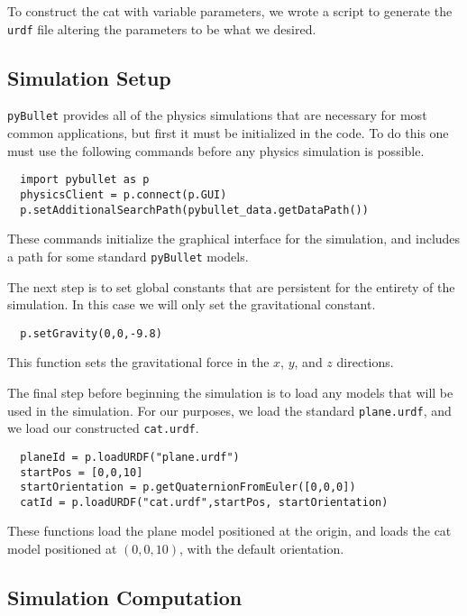 \documentclass[12]{amsart}
\theoremstyle{definition}
\begin{document}
To construct the cat with variable parameters, we wrote a script to generate
the \texttt{urdf} file altering the parameters to be what we desired.

\subsection{Simulation Setup}%
\label{sub:simulation_setup}

\texttt{pyBullet} provides all of the physics simulations that are necessary
for most common applications, but first it must be initialized in the code. To
do this one must use the following commands before any physics simulation is
possible.
\begin{verbatim}
  import pybullet as p
  physicsClient = p.connect(p.GUI)
  p.setAdditionalSearchPath(pybullet_data.getDataPath())
\end{verbatim}
These commands initialize the graphical interface for the simulation, and
includes a path for some standard \texttt{pyBullet} models.

The next step is to set global constants that are persistent for the entirety
of the simulation. In this case we will only set the gravitational constant.
\begin{verbatim}
  p.setGravity(0,0,-9.8)
\end{verbatim}
This function sets the gravitational force in the $x$, $y$, and $z$ directions.

The final step before beginning the simulation is to load any models that will
be used in the simulation. For our purposes, we load the standard
\texttt{plane.urdf}, and we load our constructed \texttt{cat.urdf}.
\begin{verbatim}
  planeId = p.loadURDF("plane.urdf")
  startPos = [0,0,10]
  startOrientation = p.getQuaternionFromEuler([0,0,0])
  catId = p.loadURDF("cat.urdf",startPos, startOrientation)
\end{verbatim}
These functions load the plane model positioned at the origin, and loads the
cat model positioned at $(0,0,10)$, with the default orientation.

\subsection{Simulation Computation}%
\label{sub:simulation_computation}
\end{document}

